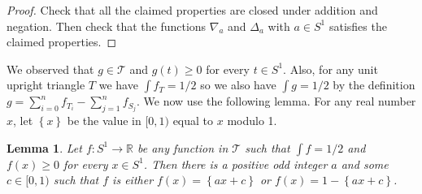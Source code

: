 \documentclass[a4paper]{amsart}
\theoremstyle{plain}
\newtheorem{lemma}{Lemma}
\theoremstyle{definition}
\begin{document}
\begin{proof}
Check that all the claimed properties are closed under addition and negation. Then check that the functions \(\nabla_a\) and \(\Delta_a\) with \(a \in S^1\) satisfies the claimed properties.
\end{proof}

We observed that \(g \in \mathcal{T}\) and \(g(t) \geq 0\) for every \(t \in S^1\). Also, for any unit upright triangle \(T\) we have \(\int f_T = 1/2\) so we also have \(\int g = 1/2\) by the definition \(g = \sum_{i=0}^n f_{T_i} - \sum_{j=1}^n f_{S_j}\). 
We now use the following lemma.
For any real number \(x\), let \(\left\{ x \right\}\) be the value in \([0, 1)\) equal to \(x\) modulo 1.

\begin{lemma}

Let \(f : S^1 \to \mathbb{R}\) be any function in \(\mathcal{T}\) such that \(\int f = 1/2\) and \(f(x) \geq 0\) for every \(x \in S^1\). Then there is a positive odd integer \(a\) and some \(c \in [0, 1)\) such that \(f\) is either \(f(x) = \left\{ ax + c \right\}\) or \(f(x) = 1 - \left\{ ax + c \right\}\).

\label{lem:triangle-unit-area}
\end{lemma}
\end{document}
